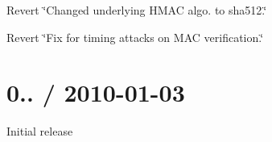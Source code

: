 \begin{DoxyItemize}
\item Revert \char`\"{}\+Changed underlying H\+M\+A\+C algo. to sha512.\char`\"{}
\item Revert \char`\"{}\+Fix for timing attacks on M\+A\+C verification.\char`\"{}
\end{DoxyItemize}

\section*{0.. / 2010-\/01-\/03 }


\begin{DoxyItemize}
\item Initial release 
\end{DoxyItemize}